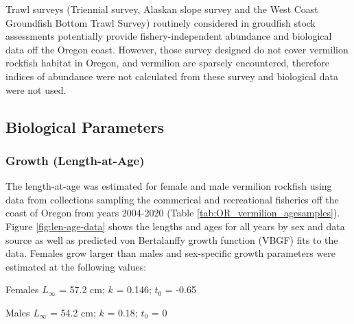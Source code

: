\documentclass[11pt,
  english,
  a4paper,
]{article}
\begin{document}
Trawl surveys (Triennial survey, Alaskan slope survey and the West Coast Groundfish Bottom Trawl Survey) routinely considered in groudfish stock assessments potentially provide fishery-independent abundance and biological data off the Oregon coast. However, those survey designed do not cover vermilion rockfish habitat in Oregon, and vermilion are sparsely encountered, therefore indices of abundance were not calculated from these survey and biological data were not used.

\leavevmode\tagmcend\tagstructend\par


\hypertarget{biological-parameters}{%
\subsection{Biological Parameters}\label{biological-parameters}}

\leavevmode\tagmcend\tagstructend


\hypertarget{growth-length-at-age}{%
\subsubsection{Growth (Length-at-Age)}\label{growth-length-at-age}}

\leavevmode\tagmcend\tagstructend


The length-at-age was estimated for female and male vermilion rockfish using data from collections sampling the commerical and recreational fisheries off the coast of Oregon from years 2004-2020 (Table \ref{tab:OR_vermilion_agesamples}). Figure \ref{fig:len-age-data} shows the lengths and ages for all years by sex and data source as well as predicted von Bertalanffy growth function (VBGF) fits to the data. Females grow larger than males and sex-specific growth parameters were estimated at the following values:

\leavevmode\tagmcend\tagstructend\par

\begin{centering}

Females $L_{\infty}$ = 57.2 cm; $k$ = 0.146; $t_0$ = -0.65

Males $L_{\infty}$ = 54.2 cm; $k$ = 0.18; $t_0$ = 0

\end{centering}
\end{document}
